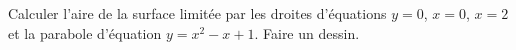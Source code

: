 
\begin{exercice}\label{exoTD5-0002}

	Calculer l'aire de la surface limitée par les droites d'équations $y=0$, $x=0$, $x=2$ et la parabole d'équation $y=x^2-x+1$. Faire un dessin.

\end{exercice}

